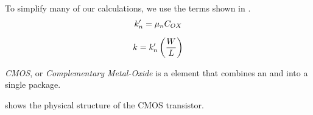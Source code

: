 To simplify many of our calculations, we use the terms shown in .
\begin{equation}\label{eq:MOSFET-kPrime}
  k_{n}' = \mu_{n} C_{OX}
\end{equation}

\begin{equation}\label{eq:MOSFET-k}
  k = k_{n}' \left( \frac{W}{L} \right)
\end{equation}

\begin{definition}[CMOS]\label{def:CMOS}
  \emph{CMOS}, or \emph{Complementary Metal-Oxide } is a  element that combines an  and  into a single package.

   shows the physical structure of the CMOS transistor.
\end{definition}


